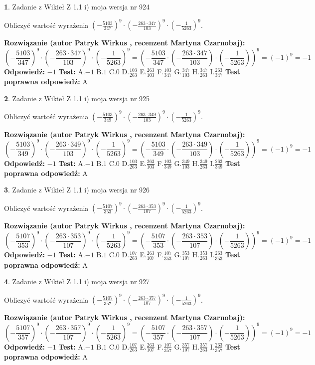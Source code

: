\documentclass[12pt, a4paper]{article}
\theoremstyle{definition} %
\newtheorem{zad}{}
\newcommand{\zadStart}[1]{\begin{zad}#1\newline}
\newcommand{\zadStop}{\end{zad}}
\newcommand{\rozwStart}[2]{\noindent \textbf{Rozwiązanie (autor #1 , recenzent #2): }\newline}
\newcommand{\rozwStop}{\newline}
\newcommand{\odpStart}{\noindent \textbf{Odpowiedź:}\newline}
\newcommand{\odpStop}{\newline}
\newcommand{\testStart}{\noindent \textbf{Test:}\newline}
\newcommand{\testStop}{\newline}
\newcommand{\kluczStart}{\noindent \textbf{Test poprawna odpowiedź:}\newline}
\newcommand{\kluczStop}{\newline}
\begin{document}
\zadStart{Zadanie z Wikieł Z 1.1 i) moja wersja nr 924}

Obliczyć wartość wyrażenia $(-\frac{5103}{347})^{9} \cdot (-\frac{263 \cdot 347}{103})^{9} \cdot (-\frac{1}{5263})^{9}$.
\zadStop
\rozwStart{Patryk Wirkus}{Martyna Czarnobaj}
$$(-\frac{5103}{347})^{9} \cdot (-\frac{263 \cdot 347}{103})^{9} \cdot (-\frac{1}{5263})^{9} = (-\frac{5103}{347} \cdot (-\frac{263 \cdot 347}{103}) \cdot (-\frac{1}{5263}))^{9} = (-1)^{9} = -1$$
\rozwStop
\odpStart
$-1$
\odpStop
\testStart
A.$-1$ B.$1$ C.$0$ D.$\frac{103}{263}$ E.$\frac{263}{103}$
F.$\frac{103}{347}$ G.$\frac{347}{103}$
H.$\frac{347}{263}$
I.$\frac{263}{347}$
\testStop
\kluczStart
A
\kluczStop



\zadStart{Zadanie z Wikieł Z 1.1 i) moja wersja nr 925}

Obliczyć wartość wyrażenia $(-\frac{5103}{349})^{9} \cdot (-\frac{263 \cdot 349}{103})^{9} \cdot (-\frac{1}{5263})^{9}$.
\zadStop
\rozwStart{Patryk Wirkus}{Martyna Czarnobaj}
$$(-\frac{5103}{349})^{9} \cdot (-\frac{263 \cdot 349}{103})^{9} \cdot (-\frac{1}{5263})^{9} = (-\frac{5103}{349} \cdot (-\frac{263 \cdot 349}{103}) \cdot (-\frac{1}{5263}))^{9} = (-1)^{9} = -1$$
\rozwStop
\odpStart
$-1$
\odpStop
\testStart
A.$-1$ B.$1$ C.$0$ D.$\frac{103}{263}$ E.$\frac{263}{103}$
F.$\frac{103}{349}$ G.$\frac{349}{103}$
H.$\frac{349}{263}$
I.$\frac{263}{349}$
\testStop
\kluczStart
A
\kluczStop



\zadStart{Zadanie z Wikieł Z 1.1 i) moja wersja nr 926}

Obliczyć wartość wyrażenia $(-\frac{5107}{353})^{9} \cdot (-\frac{263 \cdot 353}{107})^{9} \cdot (-\frac{1}{5263})^{9}$.
\zadStop
\rozwStart{Patryk Wirkus}{Martyna Czarnobaj}
$$(-\frac{5107}{353})^{9} \cdot (-\frac{263 \cdot 353}{107})^{9} \cdot (-\frac{1}{5263})^{9} = (-\frac{5107}{353} \cdot (-\frac{263 \cdot 353}{107}) \cdot (-\frac{1}{5263}))^{9} = (-1)^{9} = -1$$
\rozwStop
\odpStart
$-1$
\odpStop
\testStart
A.$-1$ B.$1$ C.$0$ D.$\frac{107}{263}$ E.$\frac{263}{107}$
F.$\frac{107}{353}$ G.$\frac{353}{107}$
H.$\frac{353}{263}$
I.$\frac{263}{353}$
\testStop
\kluczStart
A
\kluczStop



\zadStart{Zadanie z Wikieł Z 1.1 i) moja wersja nr 927}

Obliczyć wartość wyrażenia $(-\frac{5107}{357})^{9} \cdot (-\frac{263 \cdot 357}{107})^{9} \cdot (-\frac{1}{5263})^{9}$.
\zadStop
\rozwStart{Patryk Wirkus}{Martyna Czarnobaj}
$$(-\frac{5107}{357})^{9} \cdot (-\frac{263 \cdot 357}{107})^{9} \cdot (-\frac{1}{5263})^{9} = (-\frac{5107}{357} \cdot (-\frac{263 \cdot 357}{107}) \cdot (-\frac{1}{5263}))^{9} = (-1)^{9} = -1$$
\rozwStop
\odpStart
$-1$
\odpStop
\testStart
A.$-1$ B.$1$ C.$0$ D.$\frac{107}{263}$ E.$\frac{263}{107}$
F.$\frac{107}{357}$ G.$\frac{357}{107}$
H.$\frac{357}{263}$
I.$\frac{263}{357}$
\testStop
\kluczStart
A
\kluczStop
\end{document}
